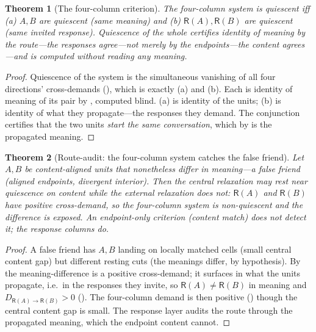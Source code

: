 \documentclass[twocolumn,11pt,a4paper]{article}
\theoremstyle{sup}
\newtheorem{theorem}{Theorem}[section]
\theoremstyle{definition}
\theoremstyle{remark}
\newcommand{\dem}{D}
\newcommand{\colA}{A}
\newcommand{\colB}{B}
\newcommand{\Resp}{\mathsf{R}}
\begin{document}
\begin{theorem}[The four-column criterion]
\label{thm:four}
The four-column system is quiescent iff \textup{(a)} $\colA,\colB$ are quiescent
(same meaning) and \textup{(b)} $\Resp(\colA),\Resp(\colB)$ are quiescent (same
invited response). Quiescence of the whole certifies identity of meaning by the
\emph{route}---the responses agree---not merely by the endpoints---the content
agrees---and is computed without reading any meaning.
\end{theorem}

\begin{proof}
Quiescence of the system is the simultaneous vanishing of all four directions'
cross-demands (), which is exactly (a) and (b). Each is identity
of meaning of its pair by , computed blind. (a) is identity
of the units; (b) is identity of what they propagate---the responses they
demand. The conjunction certifies that the two units \emph{start the same
conversation}, which by  is the propagated meaning.
\end{proof}

\begin{theorem}[Route-audit: the four-column system catches the false friend]
\label{thm:false-friend}
Let $\colA,\colB$ be content-aligned units that nonetheless differ in meaning---a
\emph{false friend} (aligned endpoints, divergent interior). Then the central
relaxation may rest near quiescence on content while the external relaxation does
not: $\Resp(\colA)$ and $\Resp(\colB)$ have positive cross-demand, so the
four-column system is non-quiescent and the difference is exposed. An
endpoint-only criterion (content match) does not detect it; the response columns
do.
\end{theorem}

\begin{proof}
A false friend has $\colA,\colB$ landing on locally matched cells (small central
content gap) but different resting cuts (the meanings differ, by hypothesis). By
 the meaning-difference is a positive cross-demand; it
surfaces in what the units propagate, i.e.\ in the responses they invite, so
$\Resp(\colA)\neq\Resp(\colB)$ in meaning and
$\dem_{\Resp(\colA)\to\Resp(\colB)}>0$ (). The four-column
demand is then positive () though the central content gap is
small. The response layer audits the route through the propagated meaning, which
the endpoint content cannot.
\end{proof}
\end{document}
